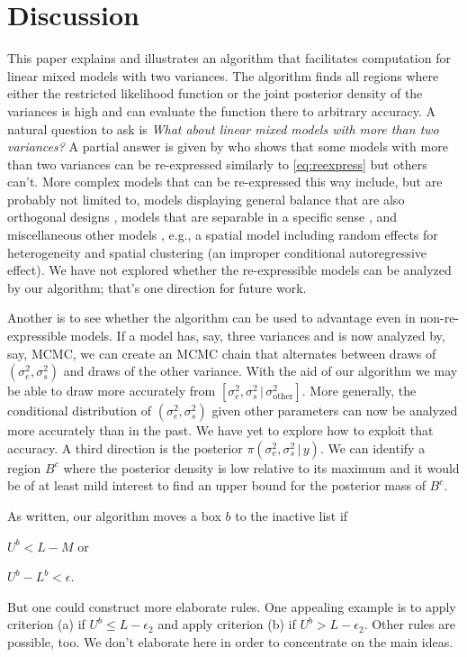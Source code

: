 \documentclass{report}
\newcommand{\sigssq}{\sigma_s^2}
\newcommand{\sigesq}{\sigma_e^2}
\newcommand{\g}{\,|\,}
\begin{document}
\section{Discussion}
This paper explains and illustrates an algorithm that facilitates computation for linear mixed models with two variances. The algorithm finds all regions where either the restricted likelihood function or the joint posterior density of the variances is high and can evaluate the function there to arbitrary accuracy.  A natural question to ask is \emph{What about linear mixed models with more than two variances?}  A partial answer is given by \cite{hodges:2013} who shows that some models with more than two variances can be re-expressed similarly to \eqref{eq:reexpress} but others can't.  More complex models that can be re-expressed this way include, but are probably not limited to, models displaying general balance that are also orthogonal designs \citep[all balanced ANOVAs plus other models;][]{houtman_speed:1983}, models that are separable in a specific sense \citep[Section 17.1.5]{hodges:2013}, and miscellaneous other models \citep[Section 17.1.5]{hodges:2013}, e.g., a spatial model including random effects for heterogeneity and spatial clustering (an improper conditional autoregressive effect). We have not explored whether the re-expressible models can be analyzed by our algorithm; that's one direction for future work.  

Another is to see whether the algorithm can be used to advantage even in non-re-expressible models.  If a model has, say, three variances and is now analyzed by, say, MCMC, we can create an MCMC chain that alternates between draws of $(\sigesq,\sigssq)$ and draws of the other variance.  With the aid of our algorithm we may be able to draw more accurately from $[\sigesq,\sigssq\g \sigma^2_\text{other}]$.  More generally, the conditional distribution of $(\sigesq,\sigssq)$ given other parameters can now be analyzed more accurately than in the past.  We have yet to explore how to exploit that accuracy.  A third direction is the posterior $\pi(\sigesq,\sigssq\g y)$.  We can identify a region $B^c$ where the posterior density is low relative to its maximum and it would be of at least mild interest to find an upper bound for the posterior mass of $B^c$.

As written, our algorithm moves a box $b$ to the inactive list if
\begin{enumerate*}[label=(\alph*)]
\item $U^b < L-M$ or
\item $U^b - L^b < \epsilon$.
\end{enumerate*}
But one could construct more elaborate rules.  One appealing example is to apply criterion (a) if $U^b \le L-\epsilon_2$ and apply criterion (b) if $U^b > L-\epsilon_2$.  Other rules are possible, too.  We don't elaborate here in order to concentrate on the main ideas.
\end{document}
